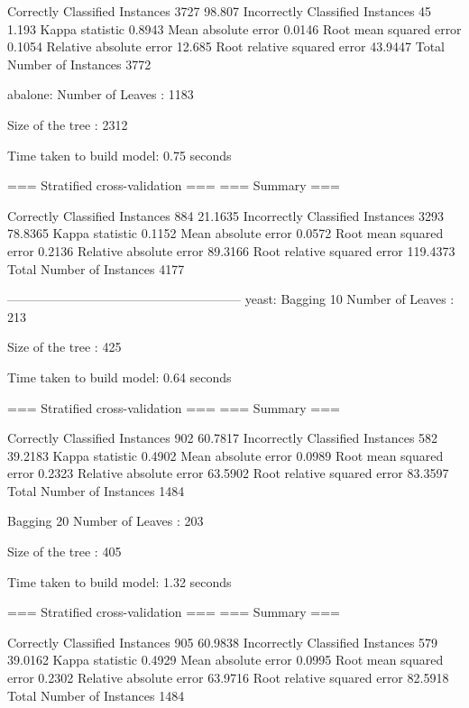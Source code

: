 Correctly Classified Instances        3727               98.807  %
Incorrectly Classified Instances        45                1.193  %
Kappa statistic                          0.8943
Mean absolute error                      0.0146
Root mean squared error                  0.1054
Relative absolute error                 12.685  %
Root relative squared error             43.9447 %
Total Number of Instances             3772     



abalone:
Number of Leaves  : 	1183

Size of the tree : 	2312


Time taken to build model: 0.75 seconds

=== Stratified cross-validation ===
=== Summary ===

Correctly Classified Instances         884               21.1635 %
Incorrectly Classified Instances      3293               78.8365 %
Kappa statistic                          0.1152
Mean absolute error                      0.0572
Root mean squared error                  0.2136
Relative absolute error                 89.3166 %
Root relative squared error            119.4373 %
Total Number of Instances             4177     


--------------------------------------------------------
yeast:
Bagging 10
Number of Leaves  : 	213

Size of the tree : 	425




Time taken to build model: 0.64 seconds

=== Stratified cross-validation ===
=== Summary ===

Correctly Classified Instances         902               60.7817 %
Incorrectly Classified Instances       582               39.2183 %
Kappa statistic                          0.4902
Mean absolute error                      0.0989
Root mean squared error                  0.2323
Relative absolute error                 63.5902 %
Root relative squared error             83.3597 %
Total Number of Instances             1484     

Bagging 20
Number of Leaves  : 	203

Size of the tree : 	405




Time taken to build model: 1.32 seconds

=== Stratified cross-validation ===
=== Summary ===

Correctly Classified Instances         905               60.9838 %
Incorrectly Classified Instances       579               39.0162 %
Kappa statistic                          0.4929
Mean absolute error                      0.0995
Root mean squared error                  0.2302
Relative absolute error                 63.9716 %
Root relative squared error             82.5918 %
Total Number of Instances             1484

